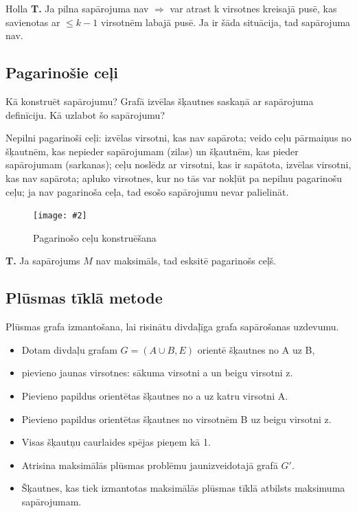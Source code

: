 \documentclass{article}
\newcommand{\illustration}[3]{
	\begin{figure}[H]
		\centering	
		\texttt{[image: \#2]}
		\caption{#3}
	\end{figure}
}
\begin{document}
Holla \textbf{T. }Ja pilna sapārojuma nav $⇒$ var atrast k virsotnes kreisajā pusē, kas savienotas ar $\le k − 1$ virsotnēm labajā pusē.  Ja ir šāda situācija, tad sapārojuma nav.

\subsection{Pagarinošie ceļi}

Kā konstruēt sapārojumu?  Grafā izvēlas šķautnes saskaņā ar sapārojuma definīciju.  Kā uzlabot šo sapārojumu?

Nepilni pagarinoši ceļi: izvēlas virsotni, kas nav sapārota; veido ceļu pārmaiņus no šķautnēm, kas nepieder sapārojumam (zilas) un šķautnēm, kas pieder sapārojumam (sarkanas); ceļu noslēdz ar virsotni, kas ir sapātota, izvēlas virsotni, kas nav sapārota; apluko virsotnes, kur no tās var nokļūt pa nepilnu pagarinošu ceļu; ja nav pagarinoša ceļa, tad esošo sapārojumu nevar palielināt.

\illustration{1}{nepilni_pagar_celi-1}{Pagarinošo ceļu konstruēšana}

\textbf{T. } Ja sapārojums $M$ nav maksimāls, tad esksitē pagarinošs ceļš.

\subsection{Plūsmas tīklā metode}

Plūsmas grafa izmantošana, lai risinātu divdaļīga grafa sapārošanas uzdevumu.

\begin{itemize}
	 \item Dotam divdaļu grafam $G = (A \cup B, E )$ orientē šķautnes no A uz B,  \item pievieno jaunas virsotnes: sākuma virsotni a un beigu virsotni z.
	 \item Pievieno papildus orientētas šķautnes no a uz katru virsotni A. \item Pievieno papildus orientētas šķautnes no virsotnēm B uz beigu virsotni z.
	 \item Visas šķautņu caurlaides spējas pieņem kā 1.
	 \item Atrisina maksimālās plūsmas problēmu jaunizveidotajā grafā $G'$.  
	 \item Šķautnes, kas tiek izmantotas maksimālās plūsmas tīklā atbilsts maksimuma sapārojumam.
\end{itemize}

\printindex
\end{document}
